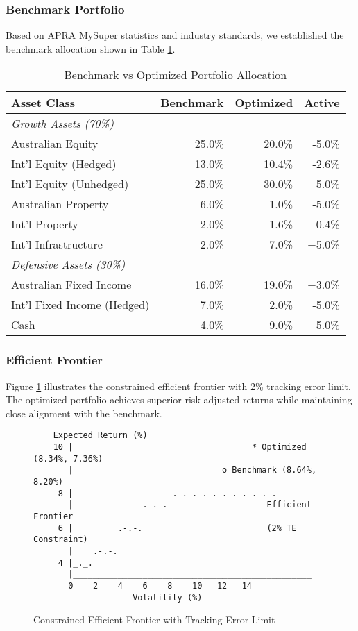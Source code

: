 \documentclass[12pt,a4paper]{article}
\begin{document}
\subsubsection{Benchmark Portfolio}
Based on APRA MySuper statistics \cite{apra2025} and industry standards, we established the benchmark allocation shown in Table \ref{tab:benchmark}.

\begin{table}[H]
\centering
\caption{Benchmark vs Optimized Portfolio Allocation}
\label{tab:benchmark}
\begin{tabular}{lrrr}
\toprule
Asset Class & Benchmark & Optimized & Active \\
\midrule
\multicolumn{4}{l}{\textit{Growth Assets (70\%)}} \\
Australian Equity & 25.0\% & 20.0\% & -5.0\% \\
Int'l Equity (Hedged) & 13.0\% & 10.4\% & -2.6\% \\
Int'l Equity (Unhedged) & 25.0\% & 30.0\% & +5.0\% \\
Australian Property & 6.0\% & 1.0\% & -5.0\% \\
Int'l Property & 2.0\% & 1.6\% & -0.4\% \\
Int'l Infrastructure & 2.0\% & 7.0\% & +5.0\% \\
\midrule
\multicolumn{4}{l}{\textit{Defensive Assets (30\%)}} \\
Australian Fixed Income & 16.0\% & 19.0\% & +3.0\% \\
Int'l Fixed Income (Hedged) & 7.0\% & 2.0\% & -5.0\% \\
Cash & 4.0\% & 9.0\% & +5.0\% \\
\bottomrule
\end{tabular}
\end{table}

\subsubsection{Efficient Frontier}
Figure \ref{fig:frontier} illustrates the constrained efficient frontier with 2\% tracking error limit. The optimized portfolio achieves superior risk-adjusted returns while maintaining close alignment with the benchmark.

\begin{figure}[H]
\centering
\begin{verbatim}
    Expected Return (%)
    10 |                                    * Optimized (8.34%, 7.36%)
       |                              o Benchmark (8.64%, 8.20%)
     8 |                    .-.-.-.-.-.-.-.-.-.-.-
       |              .-.-.                    Efficient Frontier
     6 |         .-.-.                         (2% TE Constraint)
       |    .-.-.
     4 |_._.
       |________________________________________________
       0    2    4    6    8    10   12   14
                    Volatility (%)
\end{verbatim}
\caption{Constrained Efficient Frontier with Tracking Error Limit}
\label{fig:frontier}
\end{figure}
\end{document}
